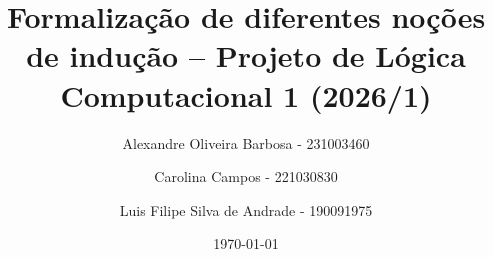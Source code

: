 \documentclass{article}
\title{Formalização de diferentes noções de indução -- Projeto de Lógica Computacional 1 (2026/1)}
\author{Alexandre Oliveira Barbosa - 231003460\and Carolina Campos - 221030830\and Luis Filipe Silva de Andrade - 190091975}
\date{\today}
\begin{document}
\maketitle



\nocite{bertot2004, huth2004, moura2026, rocq, hefez, rosen}

\end{document}
